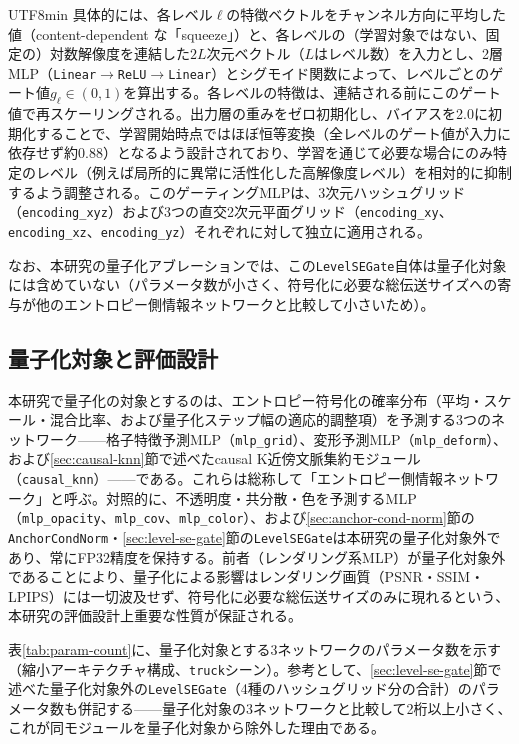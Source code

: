 \documentclass{ieeeaccess}
\begin{document}
\begin{CJK}{UTF8}{min}
具体的には、各レベル$\ell$の特徴ベクトルをチャンネル方向に平均した値（content-dependent な「squeeze」）と、各レベルの（学習対象ではない、固定の）対数解像度を連結した$2L$次元ベクトル（$L$はレベル数）を入力とし、2層MLP（\texttt{Linear}$\to$\texttt{ReLU}$\to$\texttt{Linear}）とシグモイド関数によって、レベルごとのゲート値$g_\ell \in (0,1)$を算出する。各レベルの特徴は、連結される前にこのゲート値で再スケーリングされる。出力層の重みをゼロ初期化し、バイアスを2.0に初期化することで、学習開始時点ではほぼ恒等変換（全レベルのゲート値が入力に依存せず約0.88）となるよう設計されており、学習を通じて必要な場合にのみ特定のレベル（例えば局所的に異常に活性化した高解像度レベル）を相対的に抑制するよう調整される。このゲーティングMLPは、3次元ハッシュグリッド（\texttt{encoding\_xyz}）および3つの直交2次元平面グリッド（\texttt{encoding\_xy}、\texttt{encoding\_xz}、\texttt{encoding\_yz}）それぞれに対して独立に適用される。

なお、本研究の量子化アブレーションでは、この\texttt{LevelSEGate}自体は量子化対象には含めていない（パラメータ数が小さく、符号化に必要な総伝送サイズへの寄与が他のエントロピー側情報ネットワークと比較して小さいため）。

\subsection{量子化対象と評価設計}
本研究で量子化の対象とするのは、エントロピー符号化の確率分布（平均・スケール・混合比率、および量子化ステップ幅の適応的調整項）を予測する3つのネットワーク——格子特徴予測MLP（\texttt{mlp\_grid}）、変形予測MLP（\texttt{mlp\_deform}）、および\ref{sec:causal-knn}節で述べたcausal K近傍文脈集約モジュール（\texttt{causal\_knn}）——である。これらは総称して「エントロピー側情報ネットワーク」と呼ぶ。対照的に、不透明度・共分散・色を予測するMLP（\texttt{mlp\_opacity}、\texttt{mlp\_cov}、\texttt{mlp\_color}）、および\ref{sec:anchor-cond-norm}節の\texttt{AnchorCondNorm}・\ref{sec:level-se-gate}節の\texttt{LevelSEGate}は本研究の量子化対象外であり、常にFP32精度を保持する。前者（レンダリング系MLP）が量子化対象外であることにより、量子化による影響はレンダリング画質（PSNR・SSIM・LPIPS）には一切波及せず、符号化に必要な総伝送サイズのみに現れるという、本研究の評価設計上重要な性質が保証される。

表\ref{tab:param-count}に、量子化対象とする3ネットワークのパラメータ数を示す（縮小アーキテクチャ構成、\texttt{truck}シーン）。参考として、\ref{sec:level-se-gate}節で述べた量子化対象外の\texttt{LevelSEGate}（4種のハッシュグリッド分の合計）のパラメータ数も併記する——量子化対象の3ネットワークと比較して2桁以上小さく、これが同モジュールを量子化対象から除外した理由である。


\end{CJK}
\end{document}
